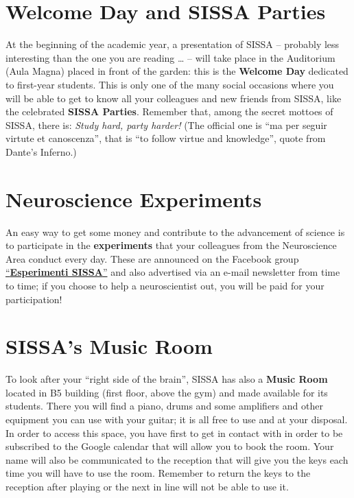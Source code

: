 \documentclass{sissavademecum}
\begin{document}
\section{Welcome Day and SISSA Parties}

At the beginning of the academic year, a presentation of SISSA -- probably less interesting than the one you are reading {\dots} -- will take place in the Auditorium (Aula Magna) placed in front of the garden: this is the \textbf{Welcome Day} dedicated to first-year students. This is only one of the many social occasions where you will be able to get to know all your colleagues and new friends from SISSA, like the celebrated \textbf{SISSA Parties}. Remember that, among the secret mottoes of SISSA, there is: \textit{Study hard, party harder!} (The official one is ``ma per seguir virtute et canoscenza'', that is ``to follow virtue and knowledge'', quote from Dante's Inferno.) 


\section{Neuroscience Experiments}

An easy way to get some money and contribute to the advancement of science is to participate in the \textbf{experiments} that your colleagues from the Neuroscience Area conduct every day. These are announced on the Facebook group \href{https://www.facebook.com/groups/144096472323480}{``\textbf{Esperimenti SISSA}''} and also advertised via an e-mail newsletter from time to time; if you choose to help a neuroscientist out, you will be paid for your participation!


\section{SISSA's Music Room}

To look after your ``right side of the brain'', SISSA has also a \textbf{Music Room} located in B5 building (first floor, above the gym) and made available for its students. There you will find a piano, drums and some amplifiers and other equipment you can use with your guitar; it is all free to use and at your disposal. In order to access this space, you have first to get in contact with  in order to be subscribed to the Google calendar that will allow you to book the room. Your name will also be communicated to the reception that will give you the keys each time you will have to use the room. Remember to return the keys to the reception after playing or the next in line will not be able to use it.
\end{document}
